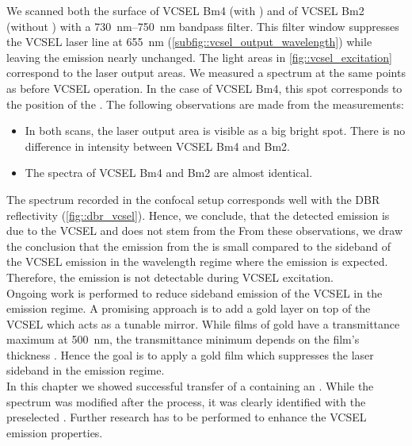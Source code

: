	We scanned both the surface of VCSEL Bm4 (with \nd) and of VCSEL Bm2 (without \nd) with a \SIrange{730}{750}{nm} bandpass filter.
	This filter window suppresses the VCSEL laser line at \SI{655}{nm} (\ref{subfig::vcsel_output_wavelength}) while leaving the \siv emission nearly unchanged.
	The light areas in \cref{fig::vcsel_excitation} correspond to the laser output areas.
	We measured a spectrum at the same points as before VCSEL operation.
	In the case of VCSEL Bm4, this spot corresponds to the position of the \siv.
	The following observations are made from the measurements:
	\begin{itemize}
		\item In both scans, the laser output area is visible as a big bright spot. There is no difference in intensity between VCSEL Bm4 and Bm2.
		\item The spectra of VCSEL Bm4 and Bm2 are almost identical.
	\end{itemize}

	The spectrum recorded in the confocal setup corresponds well with the DBR reflectivity (\cref{fig::dbr_vcsel}).
	Hence, we conclude, that the detected emission is due to the VCSEL and does not stem from the \siv{}
	From these observations, we draw the conclusion that the \fl emission from the \siv is small compared to the sideband of the VCSEL emission in the wavelength regime where the \siv emission is expected.
	Therefore, the \siv emission is not detectable during VCSEL excitation.
	\\
	Ongoing work is performed to reduce sideband emission of the VCSEL in the \siv emission regime.
	A promising approach is to add a gold layer on top of the VCSEL which acts as a tunable mirror.
	While films of gold have a transmittance maximum at \SI{500}{nm}, the transmittance minimum depends on the film's thickness \cite{Axelevitch2012}.
	Hence the goal is to apply a gold film which suppresses the laser sideband in the \siv emission regime.
	\\
	In this chapter we showed successful transfer of a \nd containing an \siv.
	While the \siv spectrum was modified after the \pp process, it was clearly identified with the preselected \siv.
	Further research has to be performed to enhance the VCSEL emission properties.
